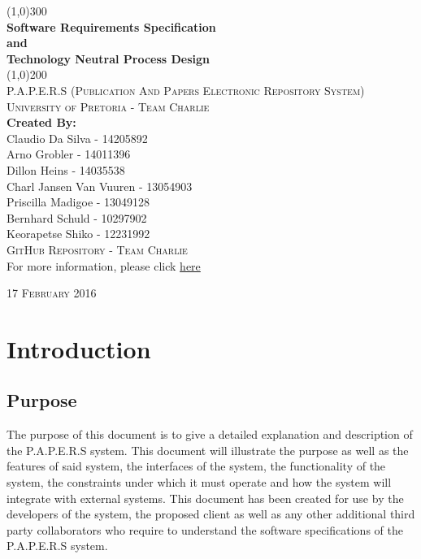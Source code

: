 \documentclass{article}
\begin{document}
	\begin{titlepage}
		\begin{center}
		
			\line(1,0){300}\\
			[6mm]
			\huge{
				\bfseries Software Requirements Specification\\
				and\\
				Technology Neutral Process Design
			}\\
			[2mm]
			\line(1,0){200}\\
			[15mm]
			\textsc{\large P.A.P.E.R.S (Publication And Papers Electronic Repository System)}\\
			[7.5mm]
			\textsc{\large University of Pretoria - Team Charlie}\\
			[20mm]
			\large{\textbf{Created By:}}\\
			[2mm]
			\large{
				Claudio Da Silva - 14205892\\
				Arno Grobler - 14011396\\
				Dillon Heins - 14035538\\
				Charl Jansen Van Vuuren - 13054903\\
				Priscilla Madigoe - 13049128\\
				Bernhard Schuld - 10297902\\
				Keorapetse Shiko - 12231992
			}\\
			[4cm]

		\textsc{\Large GitHub Repository - Team Charlie}\\[2mm]
		  For more information, please click \href{https://github.com/DillonHeins/Charlie}{here}
			
		\end{center}	
		\begin{flushright}
			\textsc{\large 17 February 2016}
		\end{flushright}
	\end{titlepage}
	
	\cleardoublepage
	\thispagestyle{empty}
	\tableofcontents
	
	\cleardoublepage
	\setcounter{page}{1}
	\section{Introduction}\label{sec:intro}
		\subsection{Purpose}\label{subsec:purpose}
			The purpose of this document is to give a detailed explanation and description of the P.A.P.E.R.S system. This document will illustrate the purpose as well as the features of said system, the interfaces of the system, the functionality of the system, the constraints under which it must operate and how the system will integrate with external systems. This document has been created for use by the developers of the system, the proposed client as well as any other additional third party collaborators who require to understand the software specifications of the P.A.P.E.R.S system.
		
\end{document}
